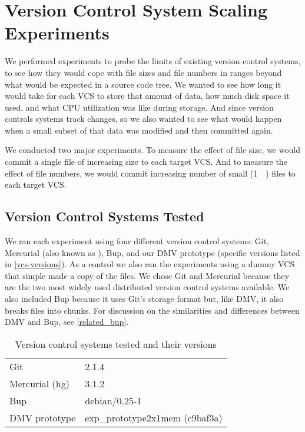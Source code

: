 \chapter{Version Control System Scaling Experiments}
\label{num-files-exp-desc}
\label{file-size-exp-desc}

We performed experiments to probe the limits of existing version control
systems, to see how they would cope with file sizes and file numbers in ranges
beyond what would be expected in a source code tree. We wanted to see how long
it would take for each VCS to store that amount of data, how much disk space it
used, and what CPU utilization was like during storage. And since version
controls systems track changes, so we also wanted to see what would happen when
a small subset of that data was modified and then committed again.

We conducted two major experiments. To measure the effect of file size, we would
commit a single file of increasing size to each target VCS. And to measure
the effect of file numbers, we would commit increasing number of small
(\SI{1}{\kibi\byte}) files to each target VCS.



\section{Version Control Systems Tested}

We ran each experiment using four different version control systems: Git,
Mercurial (also known as ), Bup, and our DMV prototype (specific
versions listed in \autoref{vcs-versions}). As a control we also ran the
experiments using a dummy VCS that simple made a copy of the files. We chose Git
and Mercurial because they are the two most widely used distributed version
control systems available. We also included Bup because it uses Git's storage
format but, like DMV, it also breaks files into chunks. For discussion on the
similarities and differences between DMV and Bup, see \autoref{related_bup}.


\begin{table}
    \caption{Version control systems tested and their versions}
    \label{vcs-versions}
    \centering
    \begin{tabular}{ l l }
        Git & 2.1.4 \\
        Mercurial (hg) & 3.1.2 \\
        Bup & debian/0.25-1 \\
        DMV prototype & exp\_prototype2x1mem (c9baf3a) \\
    \end{tabular}
\end{table}



